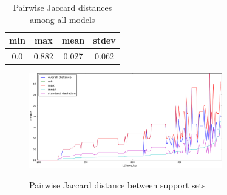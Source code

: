 \begin{table}
  \centering
  \begin{tabular}{ |c|c|c|c| }
    \hline
     min & max & mean & stdev \\[0.5ex]
    \hline
     0.0   & 0.882 & 0.027 & 0.062 \\[0.5ex]
    \hline
  \end{tabular}
  \caption{Pairwise Jaccard distances among all models}
  \label{tab:jaccard-avg}
\end{table}

\begin{figure}
  \centering
  \includegraphics[width=0.75\textwidth]{figs/jacdis2.png} \\
  \caption{Pairwise Jaccard distance between support sets}\label{fig:jacdis}
\end{figure}


